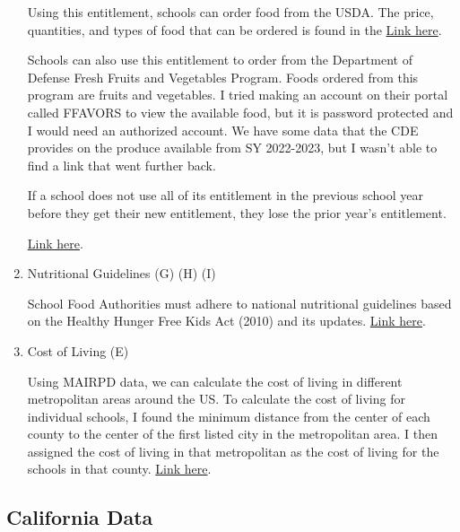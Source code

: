 \documentclass[12pt]{article}
\begin{document}
\begin{enumerate}
	Using this entitlement, schools can order food from the USDA. The price, quantities, and types of food that can be ordered is found in the \href{https://agr.wa.gov/services/food-access/hunger-relief-agency-hub/federal-food-assistance-programs/ordering-and-distribution}{Link here}.
	
	Schools can also use this entitlement to order from the Department of Defense Fresh Fruits and Vegetables Program. Foods ordered from this program are fruits and vegetables. I tried making an account on their portal called FFAVORS to view the available food, but it is password protected and I would need an authorized account. We have some data that the CDE provides on the produce available from SY 2022-2023, but I wasn't able to find a link that went further back.
	
	If a school does not use all of its entitlement in the previous school year before they get their new entitlement, they lose the prior year's entitlement. 
	
	\href{https://www.cde.ca.gov/ls/nu/fd/dodofferingschlist.asp#allocation2021}{Link here}.
	
	\item Nutritional Guidelines (G) (H) (I)

	School Food Authorities must adhere to national nutritional guidelines based on the Healthy Hunger Free Kids Act (2010) and its updates. 
	\href{https://www.govinfo.gov/content/pkg/FR-2012-01-26/pdf/2012-1010.pdf}{Link here}.
	
	\item Cost of Living (E)
	
	Using MAIRPD data, we can calculate the cost of living in different metropolitan areas around the US. To calculate the cost of living for individual schools, I found the minimum distance from the center of each county to the center of the first listed city in the metropolitan area. I then assigned the cost of living in that metropolitan as the cost of living for the schools in that county. \href{https://apps.bea.gov/itable/?ReqID=70&step=1&_gl=1*1emw7ne*_ga*ODY3NzQ3NjE4LjE3MTIwMDYxMTc.*_ga_J4698JNNFT*MTcxMjAwNjExNi4xLjEuMTcxMjAwNjI0MC42MC4wLjA.#eyJhcHBpZCI6NzAsInN0ZXBzIjpbMSwyOSwyNSwzMV0sImRhdGEiOltbIlRhYmxlSWQiLCIxMDUiXSxbIk1ham9yX0FyZWEiLCI1Il1dfQ==}{Link here}.
	
\end{enumerate}

\subsection{California Data}
\end{document}
